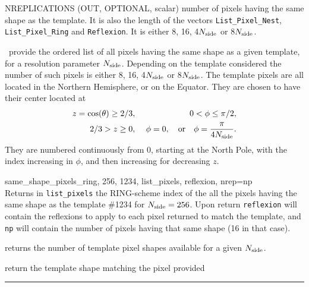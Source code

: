 
\begin{keywords}
 \begin{kwlist}{}
\item[{NREPLICATIONS}] (OUT, OPTIONAL, scalar) number of pixels having the same shape as
  the template. It is also the length of the vectors {\tt List\_Pixel\_Nest},
  {\tt List\_Pixel\_Ring} and {\tt Reflexion}. It is either 8, 16, 4${N_{\rm side}}$ or
  8${N_{\rm side}}$.
 \end{kwlist}
\end{keywords}



\begin{codedescription}
{\thedocid\ provide the ordered list of all \healpix pixels having the same shape
  as a given template, for a resolution parameter ${N_{\rm side}}$. Depending on the
  template considered the number of such pixels is either 8, 16, 4${N_{\rm side}}$ or
  8${N_{\rm side}}$. The template pixels are all located in the Northern Hemisphere, or on the
 Equator.
They are chosen to have their center located at
\begin{eqnarray}
     z=\cos(\theta)\ge 2/3,  &\ &    0< \phi \leq \pi/2,   \nonumber\\            %
     2/3 > z \geq 0,  &\ & \phi=0, \quad{\rm or}\quad  \phi=\frac{\pi}{4\nside}.  \nonumber %
\myhtmlimage{}
\end{eqnarray}
 They are numbered continuously from 0, starting at the North Pole, with the index
 increasing in $\phi$, and then increasing for decreasing $z$.
}
\end{codedescription}


\begin{example}
{
same\_shape\_pixels\_ring, 256, 1234, list\_pixels, reflexion, nrep=np  \\
}
{
Returns in {\tt list\_pixels} the RING-scheme index of the all the pixels having
the same shape as the template \#1234 for ${N_{\rm side}}=256$. Upon return {\tt reflexion} will
contain the reflexions to apply to each pixel returned to match the template,
and {\tt np} will contain the number of pixels having that same shape (16 in that case).
}
\end{example}
\begin{related}
  \begin{sulist}{} %
  \item[\htmlref{nside2templates}{idl:nside2ntemplates}] returns the
  number of template pixel shapes available for a given ${N_{\rm side}}$.
  \item[\htmlref{template\_pixel\_ring}{idl:template_pixel_xxx}] 
  \item[\htmlref{template\_pixel\_nest}{idl:template_pixel_xxx}] 
  return
  the template shape matching the pixel provided
  \end{sulist}
\end{related}

\rule{\hsize}{2mm}

